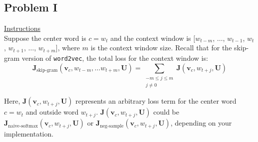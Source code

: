 \documentclass[12pt]{article}
\begin{document}
\subsection{Problem I}
\underline{Instructions}
~\\
Suppose the center word is $c = w_t$ and the context window is 
$[w_{t-m}$, $\ldots$, $w_{t-1}$, $w_{t}$, $w_{t+1}$, $\ldots$, $w_{t+m}]$, 
where $m$ is the context window size. Recall that for the  skip-gram version of {\tt word2vec}, 
the total loss for the context window is:
\begin{equation}
\bm J_{\textrm{skip-gram}}(\bm v_c, w_{t-m},\ldots w_{t+m}, \bm U) = \sum_{\substack{-m\le j \le m \\ j\ne 0}} \bm J(\bm v_c, w_{t+j}, \bm U)
\end{equation}

Here, $\bm J(\bm v_c, w_{t+j}, \bm U)$ represents an arbitrary loss term for the center
word $c=w_t$ and outside word $w_{t+j}$. $\bm J(\bm v_c, w_{t+j}, \bm U)$ could be 
$\bm J_{\text{naive-softmax}}(\bm v_c, w_{t+j}, \bm U)$ or $\bm J_{\text{neg-sample}}(\bm v_c, w_{t+j}, \bm U)$, 
depending on your implementation.
\end{document}
